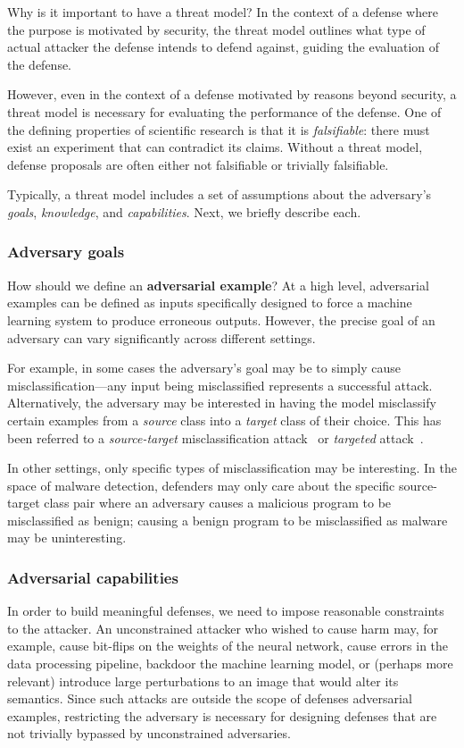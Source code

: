 \documentclass{article} %
\begin{document}
Why is it important to have a threat model? In the context of a defense where
the purpose is motivated by security, the threat model outlines what type of
actual attacker the defense intends to defend against, guiding the evaluation of the defense.

However, even in the context of a defense motivated by reasons beyond
security, a threat model is necessary for evaluating the performance of the defense.
%
One of the defining
properties of scientific research is that it is \emph{falsifiable}:
there must exist an experiment that can contradict its claims.
%
Without a threat model, defense proposals are often either not falsifiable
or trivially falsifiable.

Typically, a threat model includes a set of assumptions about the adversary's \textit{goals},
\textit{knowledge}, and  \textit{capabilities}.
%
Next, we briefly describe each.

\subsubsection{Adversary goals}
How should we define an \textbf{adversarial example}?
%
At a high level, adversarial examples can be defined as inputs
specifically designed to force a machine learning system to
produce erroneous outputs.
%
However, the precise goal of an adversary can vary significantly
across different settings.

For example, in some cases the adversary's goal may be to simply
cause misclassification---any input being misclassified
represents a successful attack.
%
Alternatively,
the adversary may be interested in having the model misclassify certain
examples from a \textit{source} class into a \textit{target} class of their choice.
%
This has been referred to a \textit{source-target} misclassification attack~\citep{papernot2016limitations}
or \textit{targeted} attack~\citep{carlini2017towards}.

In other settings, only specific types of misclassification may be interesting.
%
In the space of malware detection, defenders
may only care about the specific source-target class pair where an adversary
causes a malicious program to be misclassified as benign; causing a benign program
to be misclassified as malware may be uninteresting.

\subsubsection{Adversarial capabilities}
In order to build meaningful defenses, we need to impose reasonable constraints to the attacker.
%
An unconstrained attacker who wished to cause harm may, for example,
cause bit-flips on the
weights of the neural network, cause errors in the data processing pipeline,
backdoor the machine learning model, or (perhaps more relevant) introduce
large perturbations to an image that would alter its semantics.
%
Since such attacks are outside the scope of defenses adversarial examples,
restricting the adversary is necessary for designing defenses that are
not trivially bypassed by unconstrained adversaries.
\end{document}
